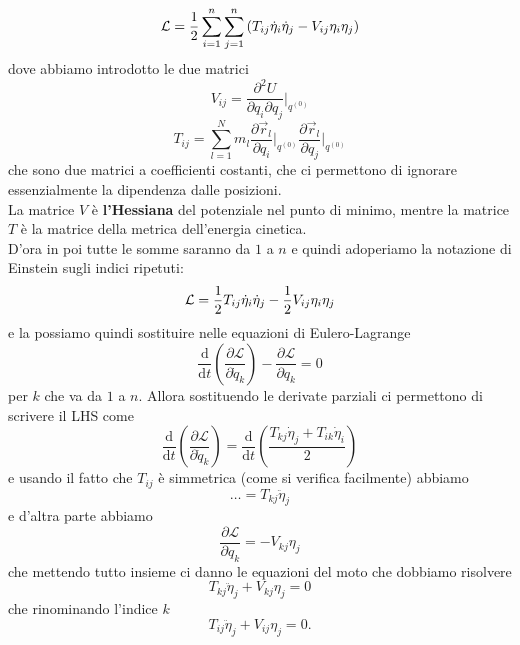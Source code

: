 \documentclass[11pt]{scrartcl}
\newcommand{\dif}{\text{d}}
\newcommand{\posit}{\vec{r}}
\begin{document}
	$$\mathcal{L}=\frac{1}{2} \sum_{i=1}^{n}\sum_{j=1}^{n}\left(T_{ij}\dot{\eta}_i\dot{\eta}_j- V_{ij}\eta_i\eta_j\right)$$
	dove abbiamo introdotto le due matrici
	$$V_{ij}=\frac{\partial^2U}{\partial q_i\partial q_j}\Bigg|_{q^{(0)}}$$
	$$T_{ij}=\sum_{l=1}^{N}m_l \frac{\partial \posit_l}{\partial q_i}\Bigg|_{q^{(0)}}\frac{\partial \posit_l}{\partial q_j}\Bigg|_{q^{(0)}}$$
	che sono due matrici a coefficienti costanti, che ci permettono di ignorare essenzialmente la dipendenza dalle posizioni. \\
	La matrice $V$ è \textbf{l'Hessiana} del potenziale nel punto di minimo, mentre la matrice $T$ è la matrice della metrica dell'energia cinetica. \\
	D'ora in poi tutte le somme saranno da $1$ a $n$ e quindi adoperiamo la notazione di Einstein sugli indici ripetuti:
	$$\mathcal{L}=\frac{1}{2} T_{ij}\dot{\eta}_i\dot{\eta}_j-\frac{1}{2} V_{ij}\eta_{i}\eta_j$$
	e la possiamo quindi sostituire nelle equazioni di Eulero-Lagrange
	$$\frac{\dif}{\dif t}\left(\frac{\partial \mathcal{L}}{\partial \dot{q}_k}\right)-\frac{\partial \mathcal{L}}{\partial q_k}=0$$
	per $k$ che va da $1$ a $n$. Allora sostituendo le derivate parziali ci permettono di scrivere il LHS come
	$$\frac{\dif}{\dif t}\left(\frac{\partial \mathcal{L}}{\partial \dot{q}_k}\right)=\frac{\dif}{\dif t}\left(\frac{T_{kj}\dot{\eta}_j+T_{ik}\dot{\eta}_i}{2}\right)$$
	e usando il fatto che $T_{ij}$ è simmetrica (come si verifica facilmente) abbiamo 
	$$\dots=T_{kj}\ddot{\eta}_j$$
	e d'altra parte abbiamo
	$$\frac{\partial \mathcal{L}}{\partial q_k}=-V_{kj}\eta_j$$
	che mettendo tutto insieme ci danno le equazioni del moto che dobbiamo risolvere
	$$T_{kj}\ddot{\eta}_j+V_{kj}\eta_j=0$$
	che rinominando l'indice $k$
	$$T_{ij}\ddot{\eta}_j+V_{ij}\eta_j=0.$$
\end{document}
